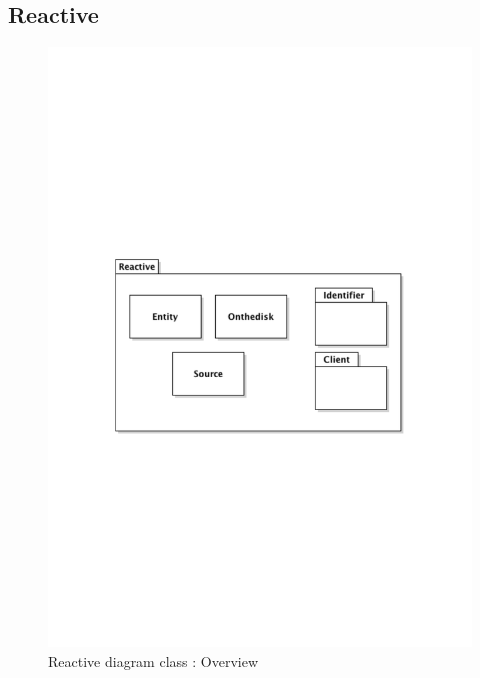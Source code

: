 	\subsection{Reactive}
		\begin{figure}[ht]
			\begin{center}
				\includegraphics[width=\textwidth,  trim=2cm 10cm 2cm 10cm]{UML_figure/DC/core/reactive/DC_Reactive.pdf}
				\caption{Reactive diagram class : Overview}
			\end{center}
		\end{figure}
